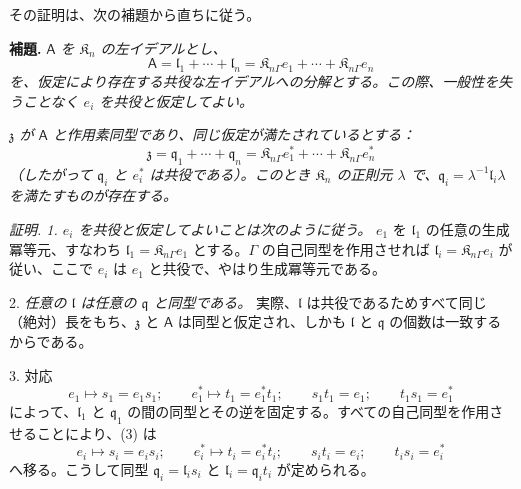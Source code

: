 その証明は、次の補題から直ちに従う。

\textbf{補題.} \emph{\(\mathsf{A}\) を \(\mathfrak K_n\) の左イデアルとし、}
\[
\mathsf{A}=\mathfrak l_1+\cdots+\mathfrak l_n
=\mathfrak K_{n\Gamma}e_1+\cdots+\mathfrak K_{n\Gamma}e_n
\]
\emph{を、仮定により存在する共役な左イデアルへの分解とする。この際、一般性を失うことなく \(e_i\) を共役と仮定してよい。}

\emph{\(\mathfrak z\) が \(\mathsf{A}\) と作用素同型であり、同じ仮定が満たされているとする：}
\[
\mathfrak z=\mathfrak q_1+\cdots+\mathfrak q_n
=\mathfrak K_{n\Gamma}e_1^*+\cdots+\mathfrak K_{n\Gamma}e_n^*
\]
\emph{（したがって \(\mathfrak q_i\) と \(e_i^*\) は共役である）。このとき \(\mathfrak K_n\) の正則元 \(\lambda\) で、\(\mathfrak q_i=\lambda^{-1}\mathfrak l_i\lambda\) を満たすものが存在する。}

\emph{証明. 1. \(e_i\) を共役と仮定してよいことは次のように従う。} \(e_1\) を \(\mathfrak l_1\) の任意の生成冪等元、すなわち \(\mathfrak l_1=\mathfrak K_{n\Gamma}e_1\) とする。\(\Gamma\) の自己同型を作用させれば \(\mathfrak l_i=\mathfrak K_{n\Gamma}e_i\) が従い、ここで \(e_i\) は \(e_1\) と共役で、やはり生成冪等元である。

2. \emph{任意の \(\mathfrak l\) は任意の \(\mathfrak q\) と同型である。} 実際、\(\mathfrak l\) は共役であるためすべて同じ（絶対）長をもち、\(\mathfrak z\) と \(\mathsf{A}\) は同型と仮定され、しかも \(\mathfrak l\) と \(\mathfrak q\) の個数は一致するからである。

3. 対応
\[
\tag{3}
e_1\mapsto s_1=e_1s_1;\qquad
e_1^*\mapsto t_1=e_1^*t_1;\qquad
s_1t_1=e_1;\qquad
t_1s_1=e_1^*
\]
によって、\(\mathfrak l_1\) と \(\mathfrak q_1\) の間の同型とその逆を固定する。すべての自己同型を作用させることにより、(3) は
\[
e_i\mapsto s_i=e_is_i;\qquad
e_i^*\mapsto t_i=e_i^*t_i;\qquad
s_it_i=e_i;\qquad
t_is_i=e_i^*
\]
へ移る。こうして同型 \(\mathfrak q_i=\mathfrak l_is_i\) と \(\mathfrak l_i=\mathfrak q_it_i\) が定められる。

